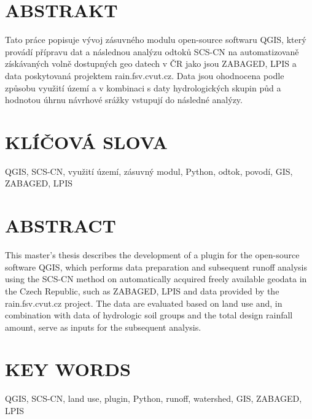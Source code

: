 \documentclass[a4paper,oneside,12pt]{book}
\begin{document}
\newbox\odstavecbox
\newlength\vyskaodstavce
\newcommand\odstavec[2]{%
    \setbox\odstavecbox=\hbox{%
         \parbox[t]{#1}{#2\vrule width 0pt depth 4pt}}%
    \global\vyskaodstavce=\dp\odstavecbox
    \box\odstavecbox}
\newcommand{\delka}{120mm} %


\section*{ABSTRAKT}
\begin{flushleft}
Tato práce popisuje vývoj zásuvného modulu open-source softwaru QGIS, který provádí přípravu dat a následnou analýzu odtoků SCS-CN  na automatizovaně získávaných volně dostupných geo datech v ČR jako jsou ZABAGED, LPIS a data poskytovaná projektem rain.fsv.cvut.cz. Data jsou ohodnocena podle způsobu využití území a v kombinaci s daty hydrologických skupin půd a hodnotou úhrnu návrhové srážky vstupují do následné analýzy.
\end{flushleft}


\section*{KLÍČOVÁ SLOVA}
\begin{flushleft}
QGIS, SCS-CN, využití území, zásuvný modul, Python, odtok, povodí, GIS, ZABAGED, LPIS
\end{flushleft}


\section*{ABSTRACT}
\begin{flushleft}
This master's thesis describes the development of a plugin for the open-source software QGIS, which performs data preparation and subsequent runoff analysis using the SCS-CN method on automatically acquired freely available geodata in the Czech Republic, such as ZABAGED, LPIS  and data provided by the rain.fsv.cvut.cz project. The data are evaluated based on land use and, in combination with data of hydrologic soil groups and the total design rainfall amount, serve as inputs for the subsequent analysis.
\end{flushleft}


\section*{KEY WORDS}
\begin{flushleft}
QGIS, SCS-CN, land use, plugin, Python, runoff, watershed, GIS, ZABAGED, LPIS
\end{flushleft}
\end{document}
